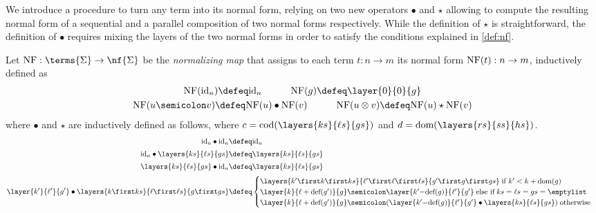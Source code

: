 We introduce a procedure to turn any term into its normal form, relying on two new operators $\bullet$ and $\star$ allowing to compute the resulting normal form of a sequential and a parallel composition of two normal forms respectively. While the definition of $\star$ is straightforward, the definition of $\bullet$ requires mixing the layers of the two normal forms in order to satisfy the conditions explained in \cref{def:nf}.
\begin{definition}\label{def:nfmap}
    Let ${\textup{NF}:\terms{\Sigma}\to \nf{\Sigma}}$ be the \emph{normalizing map} that assigns to each term $t:n\to m$ its normal form $\textup{NF}(t) : n\to m$, inductively defined as
    \vspace{-0.5em}
    \begin{gather*}
        \textup{NF}(\textup{id}_n) \defeq \textup{id}_n \hspace{3em}
        \textup{NF}(g) \defeq \layer{0}{0}{g} \\
        \textup{NF}(u\semicolon v) \defeq \textup{NF}(u)\bullet\textup{NF}(v) \hspace{3em}
        \textup{NF}(u\otimes v) \defeq \textup{NF}(u)\star\textup{NF}(v)
    \end{gather*}
    where $\bullet$ and $\star$ are inductively defined as follows, where $c=\textup{cod}(\layers{ks}{\ell s}{gs})$ and $d = \textup{dom}(\layers{rs}{ss}{hs})$.
    \begin{align*}
        \textup{id}_n \bullet \textup{id}_n&\defeq  \textup{id}_n \\[0.2em]
        \textup{id}_n \bullet \layers{ks}{\ell s}{gs} &\defeq \layers{ks}{\ell s}{gs} \\[0.2em]
        \layers{ks}{\ell s}{gs}  \bullet  \textup{id}_n&\defeq \layers{ks}{\ell s}{gs} \\[0.2em]
        \layer{k'}{\ell'}{g'}\bullet \layers{k\first ks}{\ell\first \ell s}{g\first gs}&\defeq \begin{cases}
            \layers{k'\first k\first ks}{\ell'\first \ell\first \ell s}{g'\first g\first gs} \;\text{if $k'<k+\textup{dom}(g)$}\\
            \layer{k}{\ell+\textup{def}(g')}{g}\semicolon \layer{k'{-}\textup{def}(g)}{\ell'}{g'} \; \text{else if}\; ks=\ell s=gs=\emptylist\\
            \layer{k}{\ell+\textup{def}(g')}{g}\semicolon (\layer{k'{-}\textup{def}(g)}{\ell'}{g'}\bullet \layers{ks}{\ell s}{gs}) \; \text{otherwise}
        \end{cases}\\[0.2em]

\end{align*}
\end{definition}
